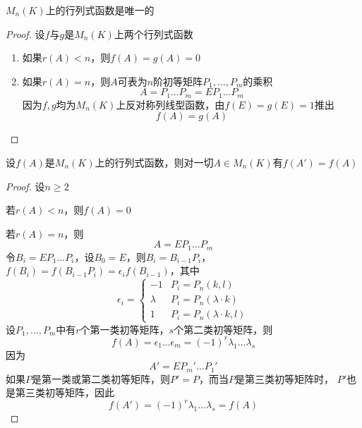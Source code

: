 \documentclass[11pt]{article}
\begin{document}
\begin{proposition}[]
\(M_n(K)\)上的行列式函数是唯一的
\end{proposition}

\begin{proof}
设\(f\)与\(g\)是\(M_n(K)\)上两个行列式函数
\begin{enumerate}
\item 如果\(r(A)<n\)，则\(f(A)=g(A)=0\)
\item 如果\(r(A)=n\)，则\(A\)可表为\(n\)阶初等矩阵\(P_1,\dots,P_m\)的乘积
\begin{equation*}
A=P_1\dots P_m=EP_1\dots P_m
\end{equation*}
因为\(f,g\)均为\(M_n(K)\)上反对称列线型函数，由\(f(E)=g(E)=1\)推出
\begin{equation*}
f(A)=g(A)
\end{equation*}
\end{enumerate}
\end{proof}

\begin{proposition}[]
设\(f(A)\)是\(M_n(K)\)上的行列式函数，则对一切\(A\in M_n(K)\)有\(f(A')=f(A)\)
\end{proposition}

\begin{proof}
设\(n\ge2\)

若\(r(A)<n\)，则\(f(A)=0\)

若\(r(A)=n\)，则
\begin{equation*}
A=EP_1\dots P_m
\end{equation*}
令\(B_i=EP_1\dots P_i\)，设\(B_0=E\)，则\(B_i=B_{i-1}P_i\)，
\(f(B_i)=f(B_{i-1}P_i)=\epsilon_i f(B_{i-1})\)，其中
\begin{equation*}
\epsilon_i=
\begin{cases}
-1&P_i=P_n(k,l)\\
\lambda&P_i=P_n(\lambda\cdot k)\\
1&P_i=P_n(\lambda\cdot k,l)
\end{cases}
\end{equation*}
设\(P_1,\dots,P_m\)中有\(r\)个第一类初等矩阵，\(s\)个第二类初等矩阵，则
\begin{equation*}
f(A)=\epsilon_1\dots\epsilon_m=(-1)^r\lambda_1\dots\lambda_s
\end{equation*}
因为
\begin{equation*}
A'=EP_m'\dots P_1'
\end{equation*}
如果\(P\)是第一类或第二类初等矩阵，则\(P'=P\)，而当\(P\)是第三类初等矩阵时，
\(P'\)也是第三类初等矩阵，因此
\begin{equation*}
f(A')=(-1)^r\lambda_1\dots\lambda_s=f(A)
\end{equation*}
\end{proof}
\end{document}
